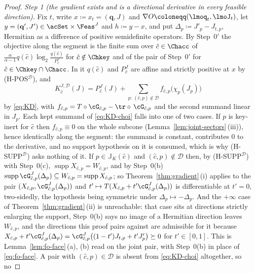 \begin{proof}
\emph{Step 1 (the gradient exists and is a directional derivative in every
feasible direction).} Fix $t$, write $x\coloneqq x_t=(\mathbf q,J)$ and
$\nabla O\coloneqq(\lmoq_t,\lmoJ_t)$, let
$y=(\mathbf q',J')\in\acSet\times\Feas^{J}$ and $h\coloneqq y-x$, and put
$\Delta_p\coloneqq J'_p-J_{t,p}$, Hermitian as a difference of positive
semidefinite operators. By Step~0$'$ the objective along the segment is the
finite sum over $\hat c\in\Chacc$ of
$\frac{\alpha}{\alpha-1}q(\hat c)\log_2\frac{q(\hat c)}{P^{J}_{\hat c}}$ for
$\hat c\notin\Chkey$ and of the pair of Step~0$'$ for
$\hat c\in\Chkey\cap\Chacc$. In it $q(\hat c)$ and $P^{J}_{\hat c}$ are affine
and strictly positive at $x$ by (H-POS$^{\mathcal{D}}$), and
\begin{equation}\label{eq:KD-choi}
  K^{J,\mathcal{D}}_{\hat c}(J)=P^{J}_{\hat c}(J)
  +\sum_{p:\,(\hat c,p)\notin\mathcal{D}}
  f_{\hat c,p}\big(\chi_p(J_p)\big)
\end{equation}
by \eqref{eq:KD}, with $f_{\hat c,p}=T\circ\cG_{\hat c,p}
-\tr\circ\,\cG_{\hat c,p}$ and the second summand linear in $J_p$. Each kept
summand of \eqref{eq:KD-choi} falls into one of two cases. If $p$ is key-inert
for $\hat c$ then $f_{\hat c,p}\equiv0$ on the whole subcone
(Lemma~\ref{lem:joint-sectors}\,(iii)), hence identically along
the segment: the summand is constant, contributes $0$ to the derivative, and
no support hypothesis on it is consumed, which is why
(H-SUPP$^{\mathcal{D}}$) asks nothing of it. If $p\in\mathbb{J}_K(\hat c)$ and
$(\hat c,p)\notin\mathcal{D}$ then, by (H-SUPP$^{\mathcal{D}}$) with Step~0(c),
$\operatorname{supp}X_{\hat c,p}=W_{\hat c,p}$, and by Step~0(b)
$\operatorname{supp}\cG^{J}_{\hat c,p}(\Delta_p)\subseteq W_{\hat c,p}
=\operatorname{supp}X_{\hat c,p}$; so
Theorem~\ref{thm:gradient}\,(i) applies to the pair
$(X_{\hat c,p},\cG^{J}_{\hat c,p}(\Delta_p))$ and
$t'\mapsto T(X_{\hat c,p}+t'\cG^{J}_{\hat c,p}(\Delta_p))$ is differentiable at
$t'=0$, two-sidedly, the hypothesis being symmetric under
$\Delta_p\mapsto-\Delta_p$. And the $+\infty$ case of
Theorem~\ref{thm:gradient}\,(ii) is unreachable: that case sits
at directions strictly enlarging the support, Step~0(b) says no image of a
Hermitian direction leaves $W_{\hat c,p}$, and the directions this proof pairs
against are admissible for it because
$X_{\hat c,p}+t'\cG^{J}_{\hat c,p}(\Delta_p)
=\cG^{J}_{\hat c,p}\big((1-t')J_{t,p}+t'J'_p\big)\succeq0$ for $t'\in[0,1]$.
This is Lemma~\ref{lem:fo-face}\,(a), (b) read on the joint pair, with
Step~0(b) in place of \eqref{eq:fo-face}. A pair with
$(\hat c,p)\in\mathcal{D}$ is absent from \eqref{eq:KD-choi} altogether, so no

\end{proof}
